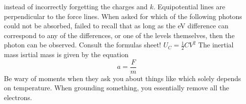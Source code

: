 instead of incorrectly forgetting the charges and $k$.\markdownRendererInterblockSeparator
{}\markdownRendererUlBeginTight
\markdownRendererUlItem Equipotential lines are perpendicular to the force lines.\markdownRendererUlItemEnd 
\markdownRendererUlItem When asked for which of the following photons could not be absorbed, failed to recall that as long as the eV difference can correspond to any of the differences, or one of the levels themselves, then the photon can be observed.\markdownRendererUlItemEnd 
\markdownRendererUlItem Consult the formulas sheet! $U_C = \frac{1}{2}CV^2$\markdownRendererUlItemEnd 
\markdownRendererUlItem The inertial mass isrtial mass is given by the equation $$a = \frac{F}{m}$$\markdownRendererUlItemEnd 
\markdownRendererUlItem Be wary of moments when they ask you about things like  which solely depends on temperature.\markdownRendererUlItemEnd 
\markdownRendererUlItem When grounding something, you essentially remove all the electrons.\markdownRendererUlItemEnd 
\markdownRendererUlEndTight \relax